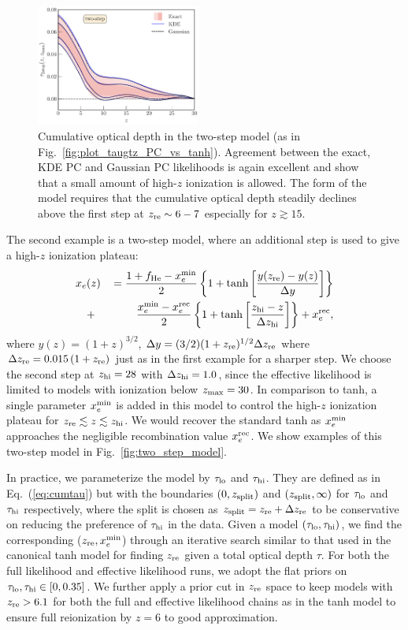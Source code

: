 \documentclass[aps,prd,twocolumn,amsmath,amssymb,showpacs,floatfix,superscriptaddress,nofootinbib]{revtex4-1}
\newcommand{\refeq}[1]{Eq.~(\ref{eq:#1})}
\newcommand{\zmax}{z_{\rm max}}
\newcommand{\zre}{z_{\rm re}}
\newcommand{\xemin}{x_e^{\rm min}}
\newcommand{\tauhi}{\tau_{\rm hi}}
\newcommand{\taulo}{\tau_{\rm lo}}
\newcommand{\bea}{\begin{eqnarray}}
\newcommand{\eea}{\end{eqnarray}}
\begin{document}
\begin{figure}
\includegraphics[width=0.48\textwidth]{pl18_taugtz_tanh_highz_direct_vs_kde_vs_gaussian.pdf}
\caption{Cumulative optical depth in the two-step model (as in Fig.~\ref{fig:plot_taugtz_PC_vs_tanh}).  Agreement between the exact, KDE PC and Gaussian PC likelihoods is again excellent and show that a small amount of high-$z$ ionization is allowed. The form of the model requires that the cumulative optical depth steadily declines above the first step at $z_{\rm re} \sim 6-7$ especially for $z\gtrsim 15$.
}
\label{fig:plot_taugtz_two_step_contours}
\end{figure}
 
The second example is a two-step model, where an additional step is used to give a high-$z$ ionization plateau: 
 \bea
x_e&(z)&\,= \frac{1+f_{\rm He} - \xemin}{2}\left\{  1+ \tanh\left[ \frac{y(z_{\rm re})-y(z)}{\Delta y} \right] \right\} \notag \\
&+& \frac{\xemin - x_e^{\rm rec}}{2}\left\{  1+ \tanh\left[ \frac{z_{\rm hi}-z}{\Delta z_{\rm hi}} \right] \right\} + x_e^{\rm rec},
 \label{eqn:tanh_highz}
 \eea
where $y(z)=(1+z)^{3/2}$, $\Delta y=(3/2)(1+z_{\rm re})^{1/2}\Delta z_{\rm re}$ where $\Delta z_{\rm re} = 0.015\, (1+z_{\rm re})$ just as in the first example for a sharper step.
We choose the second step at $z_{\rm hi}=28$ with $\Delta z_{\rm hi} = 1.0$, since the effective likelihood is limited to models with ionization below $\zmax=30$. 
In comparison to tanh, a single parameter $\xemin$ is added in this model to control the high-$z$ ionization plateau for $z_{\rm re} \lesssim z \lesssim z_{\rm hi}$. We would recover the standard tanh as $\xemin$ approaches the negligible recombination value $x_e^{\rm rec}$. We show examples
of this two-step model in Fig.~\ref{fig:two_step_model}.



In practice, we parameterize the model by $\taulo$ and $\tauhi$.  They are defined as in \refeq{cumtau} but with the boundaries $(0, z_{\rm split})$ and $(z_{\rm split}, \infty)$ for $\taulo$ and $\tauhi$ respectively, where the split is chosen as $z_{\rm split} = \zre + \Delta z_{\rm re}$ to be conservative on reducing the preference of $\tauhi$ in the data. 
Given a model $(\taulo, \tauhi)$, we find the corresponding ($\zre, \xemin$) through an iterative search similar to that used in the canonical tanh model for finding $\zre$ given a total optical depth $\tau$. 
For both the full likelihood and effective likelihood runs, we adopt the flat priors on $\taulo, \tauhi \in [0, 0.35]$.
We further apply a prior cut in $\zre$ space to keep models with $\zre > 6.1$ for both the full and effective likelihood chains as in the tanh model to ensure full reionization by $z = 6$ to good approximation. 
\end{document}
